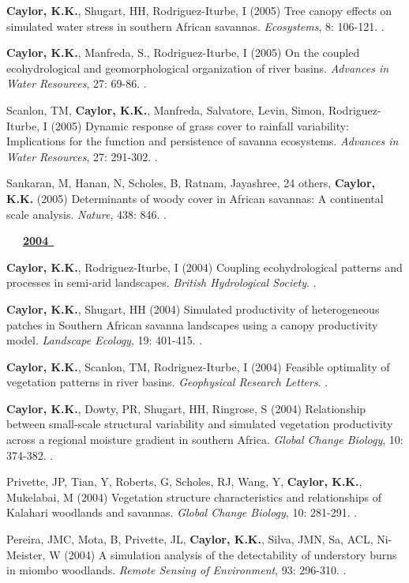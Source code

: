 \begin{etaremune}
\item \textbf{ Caylor, K.K.}, Shugart, HH, Rodriguez-Iturbe, I (2005) Tree canopy effects on simulated water stress in southern African savannas. \emph{Ecosystems}, 8: 106-121. .
\item \textbf{ Caylor, K.K.}, Manfreda, S., Rodriguez-Iturbe, I (2005) On the coupled ecohydrological and geomorphological organization of river basins. \emph{Advances in Water Resources}, 27: 69-86. .
\item Scanlon, TM, \textbf{ Caylor, K.K.}, Manfreda, Salvatore, Levin, Simon, Rodriguez-Iturbe, I (2005) Dynamic response of grass cover to rainfall variability: Implications for the function and persistence of savanna ecosystems. \emph{Advances in Water Resources}, 27: 291-302. .
\item Sankaran, M, Hanan, N, Scholes, B, Ratnam, Jayashree, 24 others, \textbf{ Caylor, K.K.} (2005) Determinants of woody cover in African savannas: A continental scale analysis. \emph{Nature}, 438: 846. .

\vspace{0.1in}
\mbox{\ \ \ \underline{\textbf{2004 }}}
\vspace{0.1in}

\item \textbf{ Caylor, K.K.}, Rodriguez-Iturbe, I (2004) Coupling ecohydrological patterns and processes in semi-arid landscapes. \emph{British Hydrological Society}. \doi{-}.
\item \textbf{ Caylor, K.K.}, Shugart, HH (2004) Simulated productivity of heterogeneous patches in Southern African savanna landscapes using a canopy productivity model. \emph{Landscape Ecology}, 19: 401-415. .
\item \textbf{ Caylor, K.K.}, Scanlon, TM, Rodriguez-Iturbe, I (2004) Feasible optimality of vegetation patterns in river basins. \emph{Geophysical Research Letters}. .
\item \textbf{ Caylor, K.K.}, Dowty, PR, Shugart, HH, Ringrose, S (2004) Relationship between small-scale structural variability and simulated vegetation productivity across a regional moisture gradient in southern Africa. \emph{Global Change Biology}, 10: 374-382. .
\item Privette, JP, Tian, Y, Roberts, G, Scholes, RJ, Wang, Y, \textbf{ Caylor, K.K.}, Mukelabai, M (2004) Vegetation structure characteristics and relationships of Kalahari woodlands and savannas. \emph{Global Change Biology}, 10: 281-291. .
\item Pereira, JMC, Mota, B, Privette, JL, \textbf{ Caylor, K.K.}, Silva, JMN, Sa, ACL, Ni-Meister, W (2004) A  simulation analysis of the detectability of understory burns in miombo woodlands. \emph{Remote Sensing of Environment}, 93: 296-310. .


\end{etaremune}
